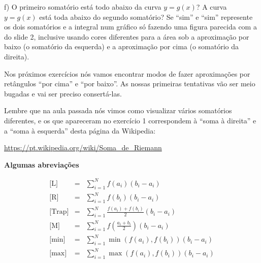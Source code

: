 \documentclass[oneside,12pt]{article}
\begin{document}
f) O primeiro somatório está todo abaixo da curva $y=g(x)$? A curva
$y=g(x)$ está toda abaixo do segundo somatório? Se ``sim'' e ``sim''
represente os dois somatórios e a integral num gráfico só fazendo uma
figura parecida com a do slide 2, inclusive usando cores diferentes
para a área sob a aproximação por baixo (o somatório da esquerda) e a
aproximação por cima (o somatório da direita).


\newpage

Nos próximos exercícios nós vamos encontrar modos de fazer
aproximações por retângulos ``por cima'' e ``por baixo''. As nossas
primeiras tentativas vão ser meio bugadas e vai ser preciso
consertá-las.

Lembre que na aula passada nós vimos como visualizar vários somatórios
diferentes, e os que apareceram no exercício 1 correspondem à ``soma à
direita'' e a ``soma à esquerda'' desta página da Wikipedia:

\ssk

\url{https://pt.wikipedia.org/wiki/Soma_de_Riemann}

\newpage


{\bf Algumas abreviações}

\def\sumiN#1{\sum_{i=1}^N #1 (b_i-a_i)}
\def\mname#1{\text{[#1]}}

$$\begin{array}{ccl}
  \mname{L}    &=& \sumiN {f(a_i)} \\
  \mname{R}    &=& \sumiN {f(b_i)} \\
  \mname{Trap} &=& \sumiN {\frac{f(a_i) + f(b_i)}{2}} \\
  \mname{M}    &=& \sumiN {f(\frac{a_i+b_i}{2})} \\
  \mname{min}  &=& \sumiN {\min(f(a_i), f(b_i))} \\
  \mname{max}  &=& \sumiN {\max(f(a_i), f(b_i))} \\
\end{array}
$$
\end{document}

